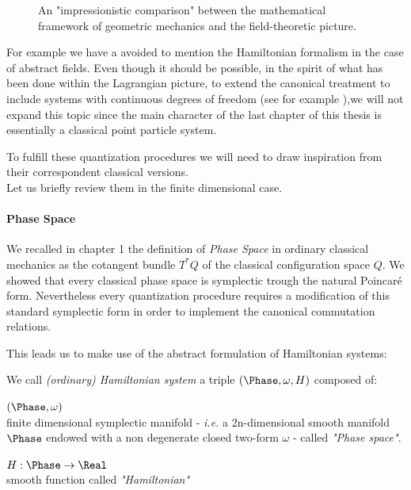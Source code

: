 \documentclass[Main]{subfiles}
\begin{document}
\begin{figure}[h!]
\begin{minipage}{0.45\textwidth}
		\end{minipage}
		\caption{An "impressionistic comparison"  between the mathematical framework of geometric mechanics and  the field-theoretic picture.}
		\end{figure}
	
	For example we have a avoided to mention the Hamiltonian formalism in the case of abstract fields.
	Even though it should be possible, in the spirit of what has been done within the Lagrangian picture, to extend the canonical treatment to include systems with continuous degrees of freedom (see for example \cite{Giachetta1999}),we will not expand this topic since the main character of the last chapter of this thesis is essentially a classical point particle system.
	
	To fulfill these quantization procedures we will need to draw inspiration from their correspondent classical versions.\\
	Let us briefly review them in the finite dimensional case.
	
			\paragraph{Phase Space}
		We recalled in chapter 1 the definition of \emph{Phase Space} in ordinary classical mechanics as the cotangent bundle $T^*Q$ of the classical configuration space $Q$.
		We showed that every classical phase space is symplectic trough the natural Poincaré form.
		Nevertheless  every quantization procedure requires a modification of this standard symplectic form in order to implement the canonical commutation relations.
	
	This leads us to make use of the abstract formulation of Hamiltonian systems\cite{Abraham1978}:
	
	\begin{definition}
			We call \emph{(ordinary) Hamiltonian system} a
			triple $(\Phase,\omega, H )$ composed of:
		\begin{compactitemize}
			\item $(\Phase,\omega)$ \\ finite dimensional symplectic manifold  - \textit{i.e.}  a 2n-dimensional smooth manifold $\Phase$ endowed with a non degenerate closed two-form $\omega$  - called \emph{"Phase space"}.
			\item	$ H :\Phase \rightarrow \Real$ \\  smooth function called \emph{"Hamiltonian"}
		\end{compactitemize}
	\end{definition}
	
\end{document}
